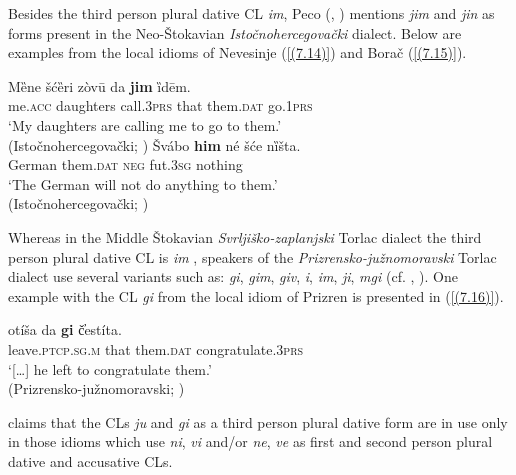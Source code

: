 Besides the third person plural dative CL \textit{im}, Peco (\citealt[203]{Peco07a}, \citealt[311]{Peco07b}) mentions \textit{jim} and \textit{jin} as forms present in the Neo-Štokavian \textit{Istočnohercegovački} dialect. Below are examples from the local idioms of Nevesinje (\ref{(7.14)}) and Borač (\ref{(7.15)}). 

\begin{exe}\ex\label{(7.14)}
\gll Mȅne  šćȅri  zòvū  da  \textbf{jim}  ȉdēm. \\
me.\textsc{acc} daughters call.3\textsc{prs}  that  them.\textsc{dat} go.1\textsc{prs}  \\
\glt ‘My daughters are calling me to go to them.’ \\
\hfill  (Istočnohercegovački; \citealt[282]{Peco07a})
\ex\label{(7.15)}
\gll Švábo  \textbf{him}  né  šće   nȉšta.  \\
German them.\textsc{dat} \textsc{neg} fut.3\textsc{sg} nothing \\
\glt ‘The German will not do anything to them.’ \\
\hfill (Istočnohercegovački; \citealt[283]{Peco07a})
\end{exe}

\noindent Whereas in the Middle Štokavian \textit{Svrljiško-zaplanjski} Torlac dialect the third person plural dative CL is \textit{im} \citep[cf.][255, 237]{Okuka08}, speakers of the \textit{Prizrensko-južnomoravski} Torlac dialect use several variants such as: \textit{gi}, \textit{gim}, \textit{giv}, \textit{i}, \textit{im}, \textit{ji}, \textit{mgi} (cf. \citealt[237]{Okuka08}, \citealt[34]{Mladenovic10}). One example with the CL \textit{gi} from the local idiom of Prizren is presented in (\ref{(7.16)}).

\begin{exe}\ex\label{(7.16)}
\gll [\dots] otíša da  \textbf{gi}  č̕estíta. \\
 {} leave.\textsc{ptcp.sg.m} that  them.\textsc{dat} congratulate.3\textsc{prs}  \\
\glt ‘[\dots] he left to congratulate them.’ \\
\hfill  (Prizrensko-južnomoravski; \citealt[247]{Okuka08})
\end{exe}

\noindent \citet[202]{Ivic57} claims that the CLs \textit{ju} and \textit{gi} as a third person plural dative form are in use only in those idioms which use \textit{ni}, \textit{vi} and/or \textit{ne}, \textit{ve} as first and second person plural dative and accusative CLs. 

